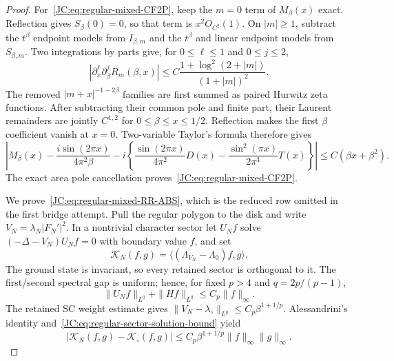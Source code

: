 \documentclass[11pt]{amsart}
\numberwithin{equation}{section}
\theoremstyle{definition}
\theoremstyle{remark}
\begin{document}
\begin{proof}
For~\eqref{JC:eq:regular-mixed-CF2P}, keep the $m=0$ term of
$M_\beta(x)$ exact.  Reflection gives $S_\beta(0)=0$, so that term is
$x^2O_{C^2}(1)$.  On $|m|\ge1$, subtract the $t^\beta$ endpoint models
from $I_{\beta,m}$ and the $t^\beta$ and linear endpoint models from
$S_{\beta,m}$.  Two integrations by parts give, for
$0\le\ell\le1$ and $0\le j\le2$,
\begin{equation}\label{JC:eq:regular-mixed-joint-remainder}
 |\partial_x^\ell\partial_\beta^jR_m(\beta,x)|
 \le C\frac{1+\log^2(2+|m|)}{(1+|m|)^2}.
\end{equation}
The removed $|m+x|^{-1-2\beta}$ families are first summed as paired
Hurwitz zeta functions.  After subtracting their common pole and finite
part, their Laurent remainders are jointly $C^{1,2}$ for
$0\le\beta\le x\le1/2$.  Reflection makes the first $\beta$ coefficient
vanish at $x=0$.  Two-variable Taylor's formula therefore gives
\[
 \left|M_\beta(x)-\frac{i\sin(2\pi x)}{4\pi^2\beta}
 -i\left\{\frac{\sin(2\pi x)}{4\pi^2}D(x)
 -\frac{\sin^2(\pi x)}{2\pi^3}T(x)\right\}\right|
 \le C(\beta x+\beta^2).
\]
The exact area pole cancellation proves~\eqref{JC:eq:regular-mixed-CF2P}.

We prove~\eqref{JC:eq:regular-mixed-RR-ABS}, which is the reduced row omitted
in the first bridge attempt.  Pull the regular polygon to the disk and
write $V_N=\lambda_N|F_N'|^2$.  In a nontrivial character sector let
$U_Nf$ solve $(-\Delta-V_N)U_Nf=0$ with boundary value $f$, and set
\[
 \mathcal K_N(f,g)=\langle(\Lambda_{V_N}-\Lambda_0)f,g\rangle.
\]
The ground state is invariant, so every retained sector is orthogonal to
it.  The first/second spectral gap is uniform; hence, for fixed $p>4$ and
$q=2p/(p-1)$,
\begin{equation}\label{JC:eq:regular-sector-solution-bound}
 \|U_Nf\|_{L^q}+\|Hf\|_{L^q}\le C_p\|f\|_\infty.
\end{equation}
The retained SC weight estimate gives
$\|V_N-\lambda_\circ\|_{L^p}\le C_p\beta^{1+1/p}$.
Alessandrini's identity and~\eqref{JC:eq:regular-sector-solution-bound} yield
\begin{equation}\label{JC:eq:regular-sector-potential-perturbation}
 |\mathcal K_N(f,g)-\mathcal K_\circ(f,g)|
 \le C_p\beta^{1+1/p}\|f\|_\infty\|g\|_\infty.
\end{equation}


\end{proof}
\end{document}

